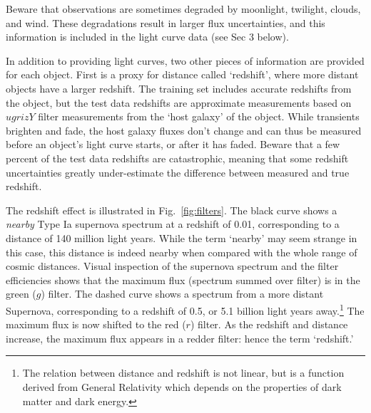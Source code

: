
Beware that observations are sometimes degraded by moonlight, twilight, clouds, and wind.
These degradations result in larger flux uncertainties, 
and this information is included in the light curve data (see Sec 3 below).

In addition to providing light curves, two other pieces of information are provided
for each object.
First is a proxy for distance called `redshift', where more distant objects have a larger redshift.
The training set includes accurate redshifts from the object, but the test data redshifts
are approximate measurements based on $ugrizY$ filter measurements from the `host galaxy' 
of the object. While transients brighten and fade, the host galaxy fluxes don't change
and can thus be measured before an object's light curve starts, or after it has faded.
Beware that a few percent of the test data redshifts are catastrophic, 
meaning that some redshift uncertainties greatly under-estimate the difference
between measured and true redshift.


The redshift effect is illustrated in Fig.~\ref{fig:filters}.
The black curve shows a {\it nearby} Type Ia supernova spectrum at a redshift of 0.01,
corresponding to a distance of 140 million light years. 
While the term `nearby' may seem strange in this case, this distance is 
indeed nearby when compared with the whole range of cosmic distances.
Visual inspection of the supernova spectrum and the filter efficiencies shows that
the maximum flux (spectrum summed over filter) is in the 
green ($g$) filter.
The dashed curve shows a spectrum from a more distant Supernova, 
corresponding to a redshift of 0.5, or 5.1 billion light years 
away.\footnote{The relation between distance and redshift is not linear, 
but is a function derived from General Relativity which depends on the properties of 
dark matter and dark energy.}  %
The maximum flux is now shifted to the red ($r$) filter.
As the redshift and distance increase, the maximum flux appears
in a redder filter: hence the term `redshift.'

